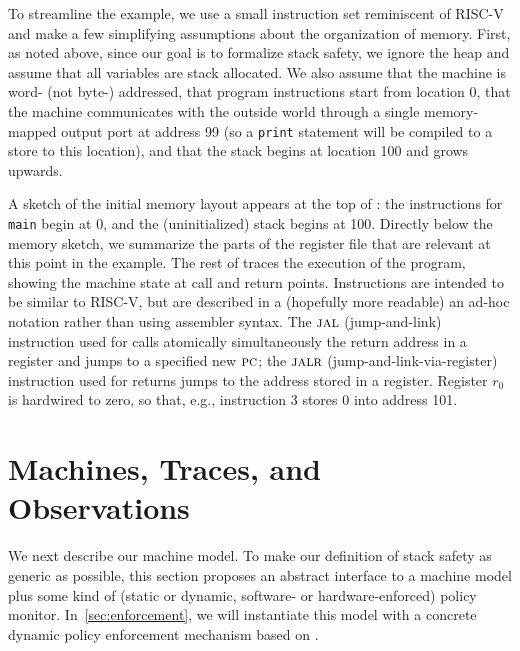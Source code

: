 \documentclass[acmsmall,review,anonymous]{acmart}\settopmatter{printfolios=true,printccs=false,printacmref=false}
\begin{document}
To streamline the example, we use a small instruction set reminiscent of
RISC-V and make a few simplifying assumptions about the organization of
memory.
%
First, as noted above, since our goal is to formalize stack safety, we
ignore the heap
and assume that all variables are stack allocated.
%
We also assume that the machine is word- (not byte-) addressed, that program
instructions start from location 0, that the machine communicates with the
outside world through a single memory-mapped output port at address 99 (so
a {\tt print} statement will be compiled to a store to this
location), and that the stack begins at location 100 and grows upwards.

A sketch of the initial memory layout appears at the top of
: the instructions for {\tt main} begin at 0,
and the (uninitialized)
stack begins at 100. Directly below the memory sketch, we summarize the parts
of the register file that are relevant at this point in the example.
%
The rest of  traces the execution of the
program, showing the machine state at call and return points.
Instructions are intended to
be similar to RISC-V, but are described in a (hopefully more readable) an
ad-hoc notation
rather than using assembler syntax. The $\textsc{jal}$ (jump-and-link)
instruction used for calls atomically simultaneously the return address in a
register
and jumps to a specified new $\textsc{pc}$; the $\textsc{jalr}$ (jump-and-link-via-register)
instruction used for returns jumps to the address stored in a register.
Register $r_0$ is hardwired to zero, so that, e.g., instruction 3 stores $0$
into address 101.



\section{Machines, Traces, and Observations}
\label{sec:prelim}

We next describe our machine model. To make our definition of stack safety
as generic as possible, this section proposes an abstract interface to a
machine model plus some kind of (static or dynamic, software- or
hardware-enforced) policy monitor. In~\cref{sec:enforcement}, we will
instantiate this model with a concrete dynamic policy enforcement mechanism
based on \citet{DBLP:conf/sp/RoesslerD18}.
\end{document}
